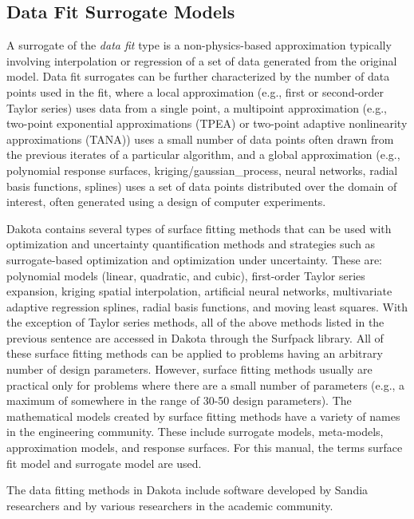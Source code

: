 \subsection{Data Fit Surrogate Models}\label{models:surrogate:datafit}

A surrogate of the {\em data fit} type is a non-physics-based
approximation typically involving interpolation or regression of a set
of data generated from the original model.  Data fit surrogates can be
further characterized by the number of data points used in the fit,
where a local approximation (e.g., first or second-order Taylor
series) uses data from a single point, a multipoint approximation
(e.g., two-point exponential approximations (TPEA) or two-point
adaptive nonlinearity approximations (TANA)) uses a small number of
data points often drawn from the previous iterates of a particular
algorithm, and a global approximation (e.g., polynomial response
surfaces, kriging/gaussian\_process, neural networks, radial basis 
functions, splines)
uses a set of data points distributed over the domain of interest,
often generated using a design of computer experiments.

Dakota contains several types of surface fitting methods that can be
used with optimization and uncertainty quantification methods and
strategies such as surrogate-based optimization and optimization under
uncertainty. These are: polynomial models (linear, quadratic, and
cubic), first-order Taylor series expansion, kriging spatial
interpolation, artificial neural networks, multivariate adaptive
regression splines, radial basis functions, and moving least squares. 
With the exception of Taylor series methods, all of the above methods 
listed in the previous sentence are accessed in Dakota through the 
Surfpack library.  All of these surface fitting methods can be
applied to problems having an arbitrary number of design parameters.
However, surface fitting methods usually are practical only for
problems where there are a small number of parameters (e.g., a maximum
of somewhere in the range of 30-50 design parameters). The
mathematical models created by surface fitting methods have a variety
of names in the engineering community. These include surrogate models,
meta-models, approximation models, and response surfaces. For this
manual, the terms surface fit model and surrogate model are used.

The data fitting methods in Dakota include software developed by
Sandia researchers and by various researchers in the academic
community.

